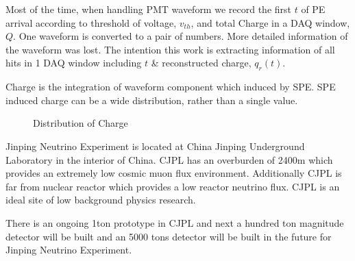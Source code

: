 Most of the time, when handling PMT waveform we record the first $t$ of PE arrival according to threshold of voltage, $v_{th}$, and total Charge in a DAQ window, $Q$. One waveform is converted to a pair of numbers. More detailed information of the waveform was lost. The intention this work is extracting information of all hits in 1 DAQ window including $t$ \& reconstructed charge, $q_{r}(t)$. 

Charge is the integration of waveform component which induced by SPE. SPE induced charge can be a wide distribution, rather than a single value. 

\begin{minipage}[b]{1.\textwidth}
\begin{figure}[H]
    \centering
    \scalebox{0.4}{}
    \caption{\label{fig:charge} Distribution of Charge}
\end{figure}
\end{minipage}

Jinping Neutrino Experiment is located at China Jinping Underground Laboratory in the interior of China. CJPL has an overburden of 2400m which provides an extremely low cosmic muon flux environment. Additionally CJPL is far from nuclear reactor which provides a low reactor neutrino flux. CJPL is an ideal site of low background physics research. 

There is an ongoing 1ton prototype in CJPL and next a hundred ton magnitude detector will be built and an 5000 tons detector will be built in the future for Jinping Neutrino Experiment. 


